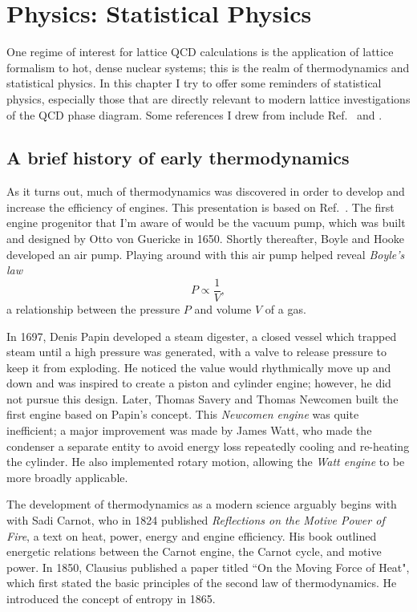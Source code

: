 \chapter{Physics: Statistical Physics}

One regime of interest for lattice QCD calculations is the application
of lattice formalism to hot, dense nuclear systems; this is the realm
of thermodynamics and statistical physics. In this chapter I try to
offer some reminders of statistical physics, especially those that
are directly relevant to modern lattice investigations of the QCD
phase diagram. Some references I drew from include
Ref.~\cite{tahir-kheli_general_2012} and \cite{kardar_statistical_2007}.

\section{A brief history of early thermodynamics}

As it turns out, much of thermodynamics was discovered in order to develop
and increase the efficiency of engines. This presentation is based
on Ref.~\cite{wiki:thermo}. The first engine progenitor that I'm
aware of would be the vacuum pump, which was built and designed by Otto von 
Guericke in 1650. Shortly thereafter, Boyle and Hooke developed an air pump.
Playing around with this air pump helped reveal {\it Boyle's law}
\begin{equation}
  P\propto\frac{1}{V},
\end{equation}
a relationship between the pressure $P$ and volume $V$ of a gas.

In 1697, Denis Papin developed a steam digester, a closed vessel which trapped steam 
until a high pressure was generated, with a valve to release pressure to keep it
from exploding.  He noticed the value would rhythmically move up and down and was 
inspired to create a piston and cylinder engine; however, he did not pursue this design. 
Later, Thomas Savery and Thomas Newcomen built the first engine based on Papin's concept.
This {\it Newcomen engine} was quite inefficient; a
major improvement was made by James Watt, who made the condenser a separate
entity to avoid energy loss repeatedly cooling and re-heating the cylinder.
He also implemented rotary motion, allowing the {\it Watt engine} to 
be more broadly applicable. 

The development of thermodynamics as a modern science arguably begins with
with Sadi Carnot, who in 1824 published {\it Reflections on the Motive Power of
Fire}, a text on heat, power, energy and engine efficiency. 
His book outlined energetic relations between the
Carnot engine, the Carnot cycle, and motive power. 
In 1850, Clausius published a paper titled ``On the Moving Force of Heat", which 
first stated the basic principles of the second law of thermodynamics. 
He introduced the concept of entropy in 1865.



